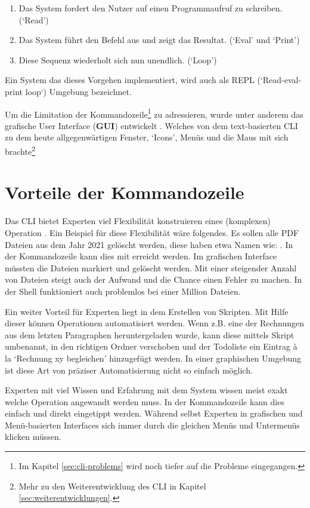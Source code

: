 \documentclass[oneside,bibliography=totocnumbered,BCOR=5mm]{scrbook}
\begin{document}
\begin{enumerate}
  \item Das System fordert den Nutzer auf einen Programmaufruf zu schreiben. (`Read')
  \item Das System führt den Befehl aus und zeigt das Resultat. (`Eval' und `Print')
  \item Diese Sequenz wiederholt sich nun unendlich. (`Loop')
\end{enumerate}

Ein System das dieses Vorgehen implementiert, wird auch als REPL
(`Read-eval-print loop`) Umgebung bezeichnet.

Um die Limitation der Kommandozeile\footnote{Im Kapitel \ref{sec:cli-problems}
wird noch tiefer auf die Probleme eingegangen.} zu adressieren, wurde
unter anderem das grafische User Interface (\textbf{GUI}) entwickelt
\parencite{nielson1993}. Welches von dem text-basierten CLI zu dem
heute allgegenwärtigen Fenster, `Icons', Menüs und die Maus mit sich
brachte\footnote{Mehr zu den Weiterentwicklung des CLI in Kapitel
\ref{sec:weiterentwicklungen}.}

\section{Vorteile der Kommandozeile}

Das CLI bietet Experten viel Flexibilität konstruieren eines (komplexen)
Operation \parencite{Norman_1983}. Ein Beispiel für diese Flexibilität wäre
folgendes. Es sollen alle PDF Dateien aus dem Jahr 2021 gelöscht werden, diese
haben etwa Namen wie: . In der Kommandozeile
kann dies mit  erreicht werden. Im grafischen Interface
müssten die Dateien markiert und gelöscht werden. Mit einer steigender Anzahl
von Dateien steigt auch der Aufwand und die Chance einen Fehler zu machen.
In der Shell funktioniert  auch problemlos bei einer Million
Dateien.

Ein weiter Vorteil für Experten liegt in dem Erstellen von Skripten. Mit Hilfe
dieser können Operationen automatisiert werden. Wenn z.B. eine der Rechnungen
aus dem letzten Paragraphen heruntergeladen wurde, kann diese mittels Skript
umbenannt, in den richtigen Ordner verschoben und der Todoliste ein Eintrag à la
`Rechnung xy begleichen' hinzugefügt werden. In einer graphischen Umgebung ist
diese Art von präziser Automatisierung nicht so einfach möglich.

Experten mit viel Wissen und Erfahrung mit dem System wissen meist exakt
welche Operation angewandt werden muss. In der Kommandozeile kann dies einfach
und direkt eingetippt werden. Während selbst Experten in grafischen und
Menü-basierten Interfaces sich immer durch die gleichen Menüs und Untermenüs
klicken müssen.
\end{document}
